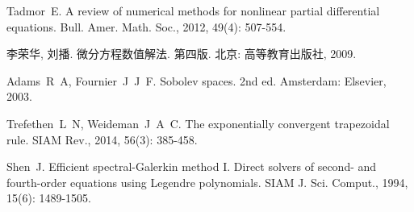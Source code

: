 

\clearpage
{}
{} %

\begin{thebibliography}{99}
 Tadmor~E. A review of numerical methods for nonlinear partial differential equations\allowbreak[J]. Bull. Amer. Math. Soc., 2012, 49(4): 507-554.

 李荣华, 刘播. 微分方程数值解法\allowbreak[M]. 第四版. 北京: 高等教育出版社, 2009.

 Adams~R~A, Fournier~J~J~F. Sobolev spaces\allowbreak[M]. 2nd ed. Amsterdam: Elsevier, 2003.

Trefethen~L~N, Weideman~J~A~C. The exponentially convergent trapezoidal rule\allowbreak[J]. SIAM Rev., 2014, 56(3): 385-458.

 Shen~J. Efficient spectral-Galerkin method I. Direct solvers of second- and fourth-order equations using Legendre polynomials\allowbreak[J]. SIAM J. Sci. Comput., 1994, 15(6): 1489-1505.

\end{thebibliography}

